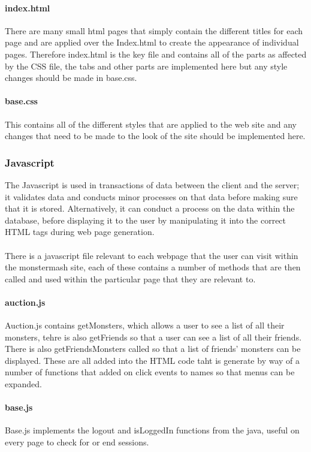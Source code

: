 \documentclass{project}
\begin{document}
\paragraph{index.html}
There are many small html pages that simply contain the different titles for each page and are applied over the Index.html to create the appearance of individual pages. Therefore index.html is the key file and contains all of the parts as affected by the CSS file, the tabs and other parts are implemented here but any style changes should be made in base.css.

\paragraph{base.css}
This contains all of the different styles that are applied to the web site and any changes that need to be made to the look of the site should be implemented here.

\subsubsection{Javascript}
The Javascript is used in transactions of data between the client and the server; it validates data and conducts minor processes on that data before making sure that it is stored. Alternatively, it can conduct a process on the data within the database, before displaying it to the user by manipulating it into the correct HTML tags during web page generation.\\
\\
There is a javascript file relevant to each webpage that the user can visit within the monstermash site, each of these contains a number of methods that are then called and used within the particular page that they are relevant to. 

\paragraph{auction.js}
Auction.js contains getMonsters, which allows a user to see a list of all their monsters, tehre is also getFriends so that a user can see a list of all their friends. There is also getFriendsMonsters called so that a list of friends' monsters can be displayed. These are all added into the HTML code taht is generate by way of a number of functions that added on click events to names so that menus can be expanded.
\paragraph{base.js}
Base.js implements the logout and isLoggedIn functions from the java, useful on every page to check for or end sessions.
\end{document}
